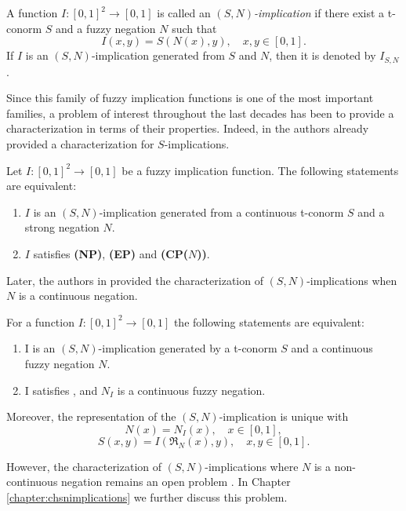 \begin{definition}\label{def:(S,N)}
	A function $I:[0,1]^2 \to [0,1]$ is called an \emph{$(S,N)$-implication} if there exist a t-conorm $S$ and a fuzzy negation $N$ such that
	$$I(x,y)=S(N(x),y), \quad x,y \in [0,1].$$
	If $I$ is an $(S,N)$-implication generated from $S$ and $N$, then it is denoted by $I_{S,N}$.
\end{definition}
Since this family of fuzzy implication functions is one of the most important families, a problem of interest throughout the last decades has been to provide a characterization in terms of their properties. Indeed, in \cite{Trillas1985} the authors already provided a characterization for $S$-implications.
\begin{theorem} 
	Let $I:[0,1]^2\to[0,1]$ be a fuzzy implication function. The following statements are equivalent:
	\begin{enumerate}[label=(\roman*)]
		\item $I$ is an $(S,N)$-implication generated from a continuous t-conorm $S$ and a strong negation $N$.
		\item $I$ satisfies {\bf (NP)}, {\bf (EP)} and {\bf (CP($N$))}.
	\end{enumerate}
\end{theorem}
Later, the authors in \cite{Baczynski2007} provided the characterization of $(S,N)$-implications when $N$ is a continuous negation.
\begin{theorem}\label{th:charac_(S,N)_Ncont}
	For a function $I : [0,1]^2 \to [0,1]$ the following statements are equivalent:
	\begin{enumerate}[label=(\roman*)]
		\item I is an $(S,N)$-implication generated by a t-conorm $S$ and a continuous fuzzy negation $N$.
		\item I satisfies \Ione, \EP and $N_I$ is a continuous fuzzy negation.
	\end{enumerate}	
	Moreover, the representation of the $(S,N)$-implication	 is unique with
	$$N(x)=N_I(x), \quad x \in [0,1],$$
	$$S(x,y)=I(\mathfrak{R}_N(x),y), \quad x,y \in [0,1].$$	
\end{theorem}

However, the characterization of $(S,N)$-implications where $N$ is a non-continuous negation remains an open problem \cite{Baczynski2013,Baczynski2007,Kacprzyk2015}. In Chapter \ref{chapter:chsnimplications} we further discuss this problem.

